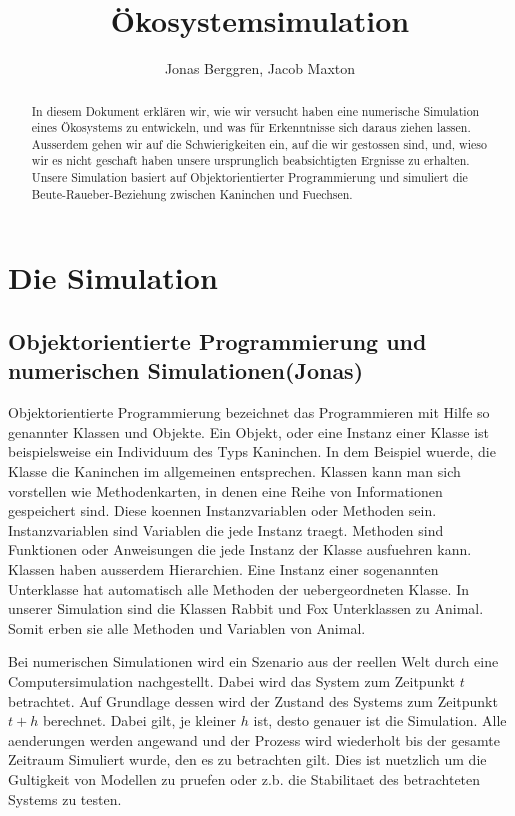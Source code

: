 \documentclass[12pt]{article}
\author{{\Large Jonas Berggren, Jacob Maxton}}
\title{{\myfont Ökosystemsimulation}}
\begin{document}
\maketitle
\begin{abstract}
In diesem Dokument erklären wir, wie wir versucht haben eine numerische Simulation eines Ökosystems zu entwickeln, und was für Erkenntnisse sich daraus ziehen lassen.
Ausserdem gehen wir auf die Schwierigkeiten ein, auf die wir gestossen sind, und, wieso wir es nicht geschaft haben unsere ursprunglich beabsichtigten Ergnisse zu erhalten.
Unsere Simulation basiert auf Objektorientierter Programmierung und simuliert die Beute-Raueber-Beziehung zwischen Kaninchen und Fuechsen.
\end{abstract}
\tableofcontents
\newpage
\section{Die Simulation}
 \subsection{Objektorientierte Programmierung und numerischen Simulationen(Jonas)}
Objektorientierte Programmierung bezeichnet das Programmieren mit Hilfe so genannter Klassen und Objekte.
Ein Objekt, oder eine Instanz einer Klasse ist beispielsweise ein Individuum des Typs Kaninchen.
In dem Beispiel wuerde, die Klasse die Kaninchen im allgemeinen entsprechen.
Klassen kann man sich vorstellen wie Methodenkarten, in denen eine Reihe von Informationen gespeichert sind.
Diese koennen Instanzvariablen oder Methoden sein.
Instanzvariablen sind Variablen die jede Instanz traegt.
Methoden sind Funktionen oder Anweisungen die jede Instanz der Klasse ausfuehren kann.
Klassen haben ausserdem Hierarchien.
Eine Instanz einer sogenannten Unterklasse hat automatisch alle Methoden der uebergeordneten Klasse.
In unserer Simulation sind die Klassen \colorbox{gray!40}{Rabbit} und
\colorbox{gray!40}{Fox} Unterklassen zu \colorbox{gray!40}{Animal}.
Somit erben sie alle Methoden und Variablen von \colorbox{gray!40}{Animal}.

Bei numerischen Simulationen wird ein Szenario aus der reellen Welt durch eine Computersimulation nachgestellt.
Dabei wird das System zum Zeitpunkt $t$ betrachtet.
Auf Grundlage dessen wird der Zustand des Systems zum Zeitpunkt $t + h$ berechnet.
Dabei gilt, je kleiner $h$ ist, desto genauer ist die Simulation.
Alle aenderungen werden angewand und der Prozess wird wiederholt bis der gesamte Zeitraum Simuliert wurde, den es zu betrachten gilt.
Dies ist nuetzlich um die Gultigkeit von Modellen zu pruefen oder z.b. die Stabilitaet des betrachteten Systems zu testen.
\end{document}
